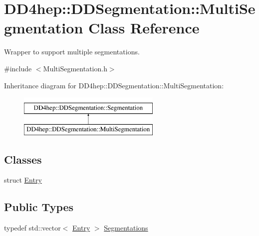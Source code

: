 \hypertarget{class_d_d4hep_1_1_d_d_segmentation_1_1_multi_segmentation}{}\section{D\+D4hep\+:\+:D\+D\+Segmentation\+:\+:Multi\+Segmentation Class Reference}
\label{class_d_d4hep_1_1_d_d_segmentation_1_1_multi_segmentation}


Wrapper to support multiple segmentations.  




{\ttfamily \#include $<$Multi\+Segmentation.\+h$>$}

Inheritance diagram for D\+D4hep\+:\+:D\+D\+Segmentation\+:\+:Multi\+Segmentation\+:\begin{figure}[H]
\begin{center}
\leavevmode
\includegraphics[height=2.000000cm]{class_d_d4hep_1_1_d_d_segmentation_1_1_multi_segmentation}
\end{center}
\end{figure}
\subsection*{Classes}
\begin{DoxyCompactItemize}
\item 
struct \hyperlink{struct_d_d4hep_1_1_d_d_segmentation_1_1_multi_segmentation_1_1_entry}{Entry}
\end{DoxyCompactItemize}
\subsection*{Public Types}
\begin{DoxyCompactItemize}
\item 
typedef std\+::vector$<$ \hyperlink{struct_d_d4hep_1_1_d_d_segmentation_1_1_multi_segmentation_1_1_entry}{Entry} $>$ \hyperlink{class_d_d4hep_1_1_d_d_segmentation_1_1_multi_segmentation_a083ba7cc081c5c3c47cafac5980100f8}{Segmentations}
\end{DoxyCompactItemize}
